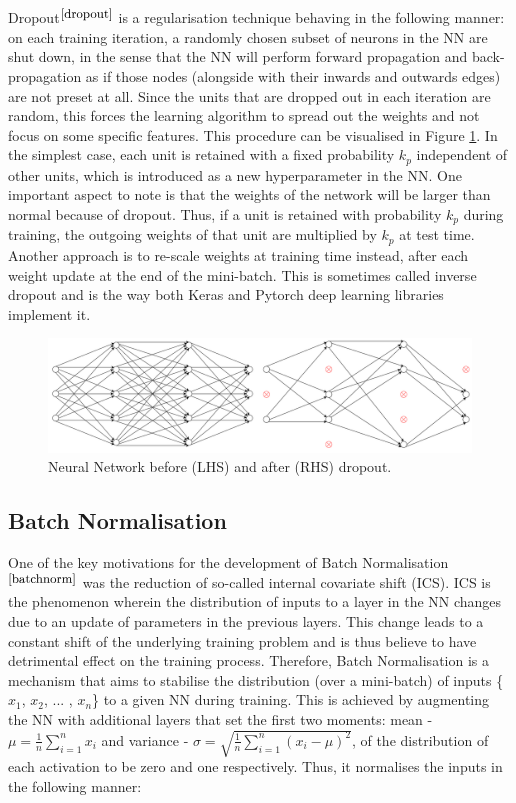 Dropout$^{\small \cite{dropout}}$ is a regularisation technique behaving in the following manner: on each training iteration, a randomly chosen subset of neurons in the NN are shut down, in the sense that the NN will perform forward propagation and back-propagation as if those nodes (alongside with their inwards and outwards edges) are not preset at all. Since the units that are dropped out in each iteration are random, this forces the learning algorithm to spread out the weights and not focus on some specific features. This procedure can be visualised in Figure \ref{dropout}. In the simplest case, each unit is retained with a fixed probability $k_p$ independent of other units, which is introduced as a new hyperparameter in the NN. One important aspect to note is that the weights of the network will be larger than normal because of dropout. Thus, if a unit is retained with probability $k_p$ during training, the outgoing weights of that unit are multiplied by $k_p$ at test
time. Another approach is to re-scale weights at training time instead, after each weight update at the end of the mini-batch. This is sometimes called inverse dropout and is the way both Keras and Pytorch deep learning libraries implement it. 


\begin{figure}[H]
  \centering
 \centerline{ \includegraphics[scale = 0.5]{Images/dropout_new.png}}

  \caption{Neural Network before (LHS) and after (RHS) dropout.}
  \label{dropout}
\end{figure}

\subsection{Batch Normalisation}


One of the key motivations for the development of Batch Normalisation$^{\small \cite{batchnorm}}$ was the reduction of so-called internal covariate shift (ICS). ICS is the phenomenon wherein the distribution of inputs to a layer in the NN changes due to an update of parameters in the previous layers. This change leads to a constant shift of the underlying training problem and is thus believe to have detrimental effect on the training process. Therefore, Batch Normalisation is a mechanism that aims to stabilise the distribution (over a mini-batch) of inputs \{$x_1$, $x_2$, ... , $x_n$\} to a given NN during training. This is achieved by augmenting the NN with additional layers that set the first two moments: mean - $\mu = \frac{1}{n} \sum_{i=1}^n x_i$ and variance - $\sigma = \sqrt{\frac{1}{n} \sum_{i=1}^n (x_i - \mu) ^ 2}$, of the distribution of each activation to be zero and one respectively. Thus, it normalises the inputs in the following manner: 

